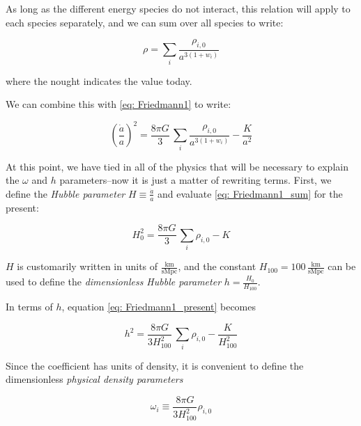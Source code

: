 As long as the different energy species do not interact, this relation will
apply to each species separately, and we can sum over all species to write:

\begin{equation}
\rho = \sum_i \frac{\rho_{i, 0}}{a^{3(1 + w_i)}}
\end{equation}

where the nought indicates the value today.

We can combine this with \ref{eq: Friedmann1} to write:

\begin{equation}
\label{eq: Friedmann1_sum}
\left( \frac{\dot{a}}{a} \right)^2
=
\frac{8 \pi G}{3} \, \sum_i \frac{\rho_{i, 0}}{a^{3(1 + w_i)}} - \frac{K}{a^2}
\end{equation}


At this point, we have tied in all of the physics that will be necessary to
explain the $\omega$ and $h$ parameters--now it is just a matter of rewriting 
terms. First, we define the \textit{Hubble parameter}
$H \equiv \frac{\dot{a}}{a}$ and evaluate \ref{eq: Friedmann1_sum}
for the present:

\begin{equation}
\label{eq: Friedmann1_present}
H_0^2 = \frac{8 \pi G}{3} \, \sum_i \rho_{i, 0} - K
\end{equation}

$H$ is customarily written in units of
$\frac{\mathrm{km}}{\mathrm{s} \mathrm{Mpc}}$, and the constant
$H_{100} = 100 \, \frac{\mathrm{km}}{\mathrm{s} \mathrm{Mpc}}$ can be used to
define the \textit{dimensionless Hubble parameter} $h = \frac{H_0}{H_{100}}$.


In terms of $h$, equation \ref{eq: Friedmann1_present} becomes

\begin{equation}
h^2 = \frac{8 \pi G}{3 H_{100}^2} \, \sum_i \rho_{i, 0} - \frac{K}{H^2_{100}}
\end{equation}


Since the coefficient has units of density, it is convenient to define the
dimensionless \textit{physical density parameters}

\begin{equation}
\omega_i \equiv \frac{8 \pi G}{3 H_{100}^2} \rho_{i, 0}
\end{equation}


